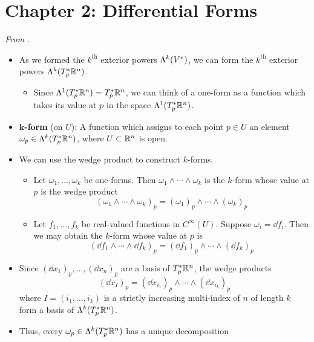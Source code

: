 \documentclass[../notes.tex]{subfiles}
\begin{document}
\section{Chapter 2: Differential Forms}
\emph{From \textcite{bib:DifferentialForms}.}
\begin{itemize}
    \item {}As we formed the $k^\text{th}$ exterior powers $\lam[k]{V^*}$, we can form the $k^\text{th}$ exterior powers $\lam[k]{T_p^*\R^n}$.
    \begin{itemize}
        \item Since $\lam[1]{T_p^*\R^n}=T_p^*\R^n$, we can think of a one-form as a function which takes its value at $p$ in the space $\lam[1]{T_p^*\R^n}$.
    \end{itemize}
    \item \textbf{$\bm{k}$-form} (on $U$): A function which assigns to each point $p\in U$ an element $\omega_p\in\lam[k]{T_p^*\R^n}$, where $U\subset\R^n$ is open.
    \item We can use the wedge product to construct $k$-forms.
    \begin{itemize}
        \item Let $\omega_1,\dots,\omega_k$ be one-forms. Then $\omega_1\wedge\cdots\wedge\omega_k$ is the $k$-form whose value at $p$ is the wedge product
        \begin{equation*}
            (\omega_1\wedge\cdots\wedge\omega_k)_p = (\omega_1)_p\wedge\cdots\wedge(\omega_k)_p
        \end{equation*}
        \item Let $f_1,\dots,f_k$ be real-valued functions in $C^\infty(U)$. Suppose $\omega_i=\dd f_i$. Then we may obtain the $k$-form whose value at $p$ is
        \begin{equation*}
            (\dd f_1\wedge\cdots\wedge\dd f_k)_p = (\dd f_1)_p\wedge\cdots\wedge(\dd f_k)_p
        \end{equation*}
    \end{itemize}
    \item Since $(\dd x_1)_p,\dots,(\dd x_n)_p$ are a basis of $T_p^*\R^n$, the wedge products
    \begin{equation*}
        (\dd x_I)_p = (\dd x_{i_1})_p\wedge\cdots\wedge(\dd x_{i_k})_p
    \end{equation*}
    where $I=(i_1,\dots,i_k)$ is a strictly increasing multi-index of $n$ of length $k$ form a basis of $\lam[k]{T_p^*\R^n}$.
    \item Thus, every $\omega_p\in\lam[k]{T_p^*\R^n}$ has a unique decomposition

\end{itemize}
\end{document}
